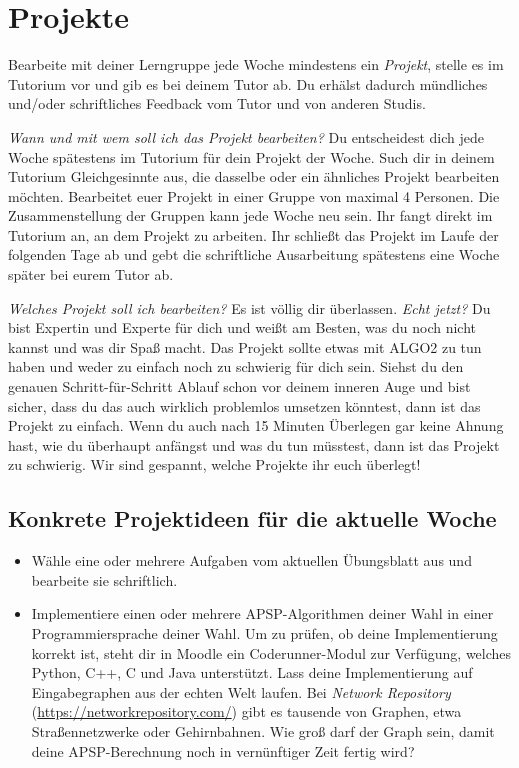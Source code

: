 \documentclass{uebung_cs}
\begin{document}
\newpage
\section*{\projekt{} Projekte}

Bearbeite mit deiner Lerngruppe jede Woche mindestens ein \emph{Projekt}, stelle es im Tutorium vor und gib es bei deinem Tutor ab.
Du erhälst dadurch mündliches und/oder schriftliches Feedback vom Tutor und von anderen Studis.

\emph{Wann und mit wem soll ich das Projekt bearbeiten?}
Du entscheidest dich jede Woche spätestens im Tutorium für dein Projekt der Woche.
Such dir in deinem Tutorium Gleichgesinnte aus, die dasselbe oder ein ähnliches Projekt bearbeiten möchten.
Bearbeitet euer Projekt in einer Gruppe von maximal 4 Personen.
Die Zusammenstellung der Gruppen kann jede Woche neu sein.
Ihr fangt direkt im Tutorium an, an dem Projekt zu arbeiten.
Ihr schließt das Projekt im Laufe der folgenden Tage ab und gebt die schriftliche Ausarbeitung spätestens eine Woche später bei eurem Tutor ab.

\emph{Welches Projekt soll ich bearbeiten?}
Es ist völlig dir überlassen.
\emph{Echt jetzt?}
Du bist Expertin und Experte für dich und weißt am Besten, was du noch nicht kannst und was dir Spaß macht.
Das Projekt sollte etwas mit ALGO2 zu tun haben und weder zu einfach noch zu schwierig für dich sein. Siehst du den genauen Schritt-für-Schritt Ablauf schon vor deinem inneren Auge und bist sicher, dass du das auch wirklich problemlos umsetzen könntest, dann ist das Projekt zu einfach.
Wenn du auch nach 15 Minuten Überlegen gar keine Ahnung hast, wie du überhaupt anfängst und was du tun müsstest, dann ist das Projekt zu schwierig.
Wir sind gespannt, welche Projekte ihr euch überlegt!

\subsection*{Konkrete Projektideen für die aktuelle Woche}
\begin{itemize}
  \item
  Wähle eine oder mehrere Aufgaben vom aktuellen Übungsblatt aus und bearbeite sie schriftlich.
  \item
  Implementiere einen oder mehrere APSP-Algorithmen deiner Wahl in einer Programmiersprache deiner Wahl.
  Um zu prüfen, ob deine Implementierung korrekt ist, steht dir in Moodle ein Coderunner-Modul zur Verfügung, welches Python, C++, C und Java unterstützt.
  Lass deine Implementierung auf Eingabegraphen aus der echten Welt laufen.
  Bei \emph{Network Repository} (\url{https://networkrepository.com/}) gibt es tausende von Graphen, etwa Straßennetzwerke oder Gehirnbahnen.
  Wie groß darf der Graph sein, damit deine APSP-Berechnung noch in vernünftiger Zeit fertig wird?
\end{itemize}
\end{document}
